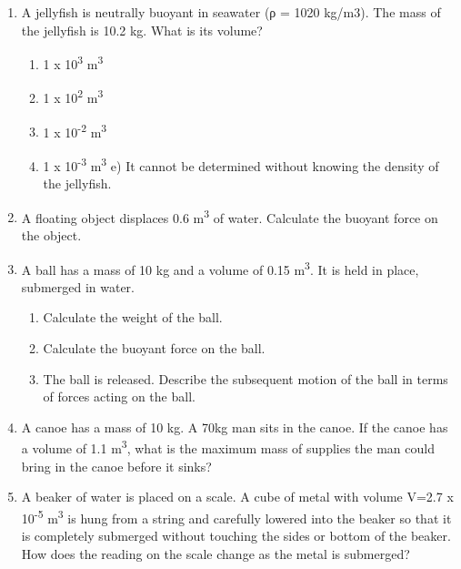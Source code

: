 \documentclass[letterpaper, 11pt]{article}
\begin{document}
\begin{enumerate}
	\item A jellyfish is neutrally buoyant in seawater (ρ = 1020 kg/m3).  The mass of the jellyfish is 10.2 kg.  What is its volume?
	\begin{enumerate}
		\item 1 x 10\textsuperscript{3} m\textsuperscript{3}
		\item 1 x 10\textsuperscript{2} m\textsuperscript{3}
 		\item 1 x 10\textsuperscript{-2} m\textsuperscript{3}
 		\item 1 x 10\textsuperscript{-3} m\textsuperscript{3}
 		e) It cannot be determined without knowing the density of the jellyfish.
	\end{enumerate}
 	\vspace{.25in}
 	\item A floating object displaces 0.6 m\textsuperscript{3} of water. Calculate the buoyant force on the object.
 	\vspace{.85in}
 	
 	\item A ball has a mass of 10 kg and a volume of 0.15 m\textsuperscript{3}.  It is held in place, submerged in water.
	\begin{enumerate}
		\vspace{-.1in}
		\item Calculate the weight of the ball.
		\vspace{.35in}
		\item Calculate the buoyant force on the ball.
		\vspace{.35in}
 		\item The ball is released.  Describe the subsequent motion of the ball in terms of forces acting on the ball.
 		\vspace{.35in}
 		
\end{enumerate}
 
 \item A canoe has a mass of 10 kg.  A 70kg man sits in the canoe.  If the canoe has a volume of 1.1 m\textsuperscript{3}, what is the maximum mass of supplies the man could bring in the canoe before it sinks?
 \vspace{.4in}
 
 \item A beaker of water is placed on a scale.  A cube of metal with volume V=2.7 x 10\textsuperscript{-5} m\textsuperscript{3}  is hung from a string and carefully lowered into the beaker so that it is completely submerged without touching the sides or bottom of the beaker.  How does the reading on the scale change as the metal is submerged? 


\end{enumerate}
\end{document}
